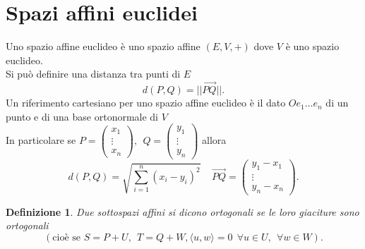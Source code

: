 \documentclass[12px]{article}
\theoremstyle{break}
\theoremstyle{break}
\theoremstyle{break}
\newtheorem{defin}{Definizione}
\theoremstyle{break}
\theoremstyle{break}
\theoremstyle{break}
\newenvironment{defi}
{\begin{mdframed}[linecolor=orange, backgroundcolor=orange!10]\begin{defin}}
  {\end{defin}\end{mdframed}}
\newcommand{\icol}[1]{%
  \left(\begin{smallmatrix}#1\end{smallmatrix}\right)%
}
\begin{document}
\section{Spazi affini euclidei}
Uno spazio affine euclideo è uno spazio affine $(E,V, +)$ dove $V$ è uno spazio euclideo.\\
Si può definire una distanza tra punti di $E$ 
\[
 d(P,Q) = ||\overrightarrow{PQ}||
.\] 
Un riferimento cartesiano per uno spazio affine euclideo è il dato $Oe_1\ldots e_n$ di un punto e di una base ortonormale di $V$\\
In particolare se $P = \icol{ x_1\\\vdots\\x_n}, \ \ Q = \icol{y_1\\\vdots\\y_n}$ allora
\[
	d(P,Q) = \sqrt{\sum^n_{i=1}(x_i - y_i)^2}\ \ \ \ \ \overrightarrow{PQ} = \icol{y_1 - x_1\\ \vdots \\ y_n - x_n}
.\] 
\begin{defi}
	Due sottospazi affini si dicono ortogonali se le loro giaciture sono ortogonali 
	\[
		(\text{cioè se } S = P + U, \ \ T = Q + W, \langle u, w \rangle  = 0\ \ \forall u \in U , \ \ \forall w\in W)
	.\] 
\end{defi}
\end{document}
